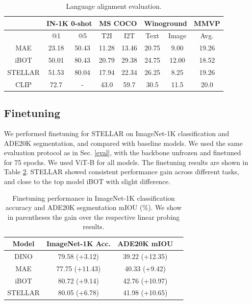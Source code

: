 \begin{table}[ht]
\caption{Language alignment evaluation.}
\label{vlm-table}
\begin{center}
\begin{tabular}{c|cc|cc|cc|c}
\multicolumn{1}{c}{}   & \multicolumn{2}{c}{IN-1K 0-shot} &  \multicolumn{2}{c}{MS COCO} & \multicolumn{2}{c}{Winoground} & MMVP \\
\hline 
  &      @1  & @5 & T2I & I2T & Text & Image & Avg. \\
\hline 
MAE &   23.18 & 50.43 & 11.28 & 13.46 & 20.75 & 9.00 & 19.26 \\
iBOT &  50.01 & 80.43 & 20.79 & 29.38 & 24.75 & 12.00 & 18.52 \\
STELLAR &   51.53 & 80.04 & 17.94 & 22.34 & 26.25 & 8.25 & 19.26 \\
\hline
CLIP  &  72.7 & - & 43.0 & 59.7 & 30.5 & 11.5 & 20.0
\end{tabular}
\end{center}
\end{table}

\subsection{Finetuning}
We performed finetuning for STELLAR on ImageNet-1K classification and ADE20K segmentation, and compared with baseline models. We used the same evaluation protocol as in Sec. \ref{eval}, with the backbone unfrozen and finetuned for 75 epochs. We used ViT-B for all models. The finetuning results are shown in Table \ref{finetune-table}. STELLAR showed consistent performance gain across different tasks, and close to the top model iBOT with slight difference.


\begin{table}[ht]

\caption{Finetuning performance in ImageNet-1K classification accuracy and ADE20K segmentation mIOU (\%). We show in parentheses the gain over the respective linear probing results.}
\label{finetune-table}
\begin{center}
\begin{tabular}{c|ccc}
 Model & ImageNet-1K Acc. & ADE20K mIOU \\
\hline 
DINO & 79.58 (+3.12) & 39.22 (+12.35) \\
MAE & 77.75 (+11.43) & 40.33 (+9.42) \\
iBOT & 80.72 (+9.14) & 42.76 (+10.97) \\
\hline
STELLAR & 80.05 (+6.78) & 41.98 (+10.65)
\end{tabular}
\end{center}
\end{table}


